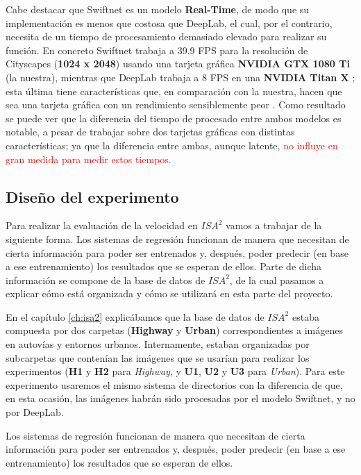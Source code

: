 Cabe destacar que Swiftnet \cite{swiftnet} es un modelo \textbf{Real-Time}, de modo que su implementación es menos que costosa que DeepLab, el cual, por el contrario, necesita de un tiempo de procesamiento demasiado elevado para realizar su función. En concreto Swiftnet trabaja a 39.9 \ac{FPS} para la resolución de Cityscapes (\textbf{1024 x 2048}) usando una tarjeta gráfica \textbf{NVIDIA GTX 1080 Ti} (la nuestra), mientras que DeepLab trabaja a 8 \ac{FPS} en una \textbf{NVIDIA Titan X} \cite{deeplab}; esta última tiene características que, en comparación con la nuestra, hacen que sea una tarjeta gráfica con un rendimiento sensiblemente peor \cite{gtx_titan}. Como resultado se puede ver que la diferencia del tiempo de procesado entre ambos modelos es notable, a pesar de trabajar sobre dos tarjetas gráficas con distintas características; ya que la diferencia entre ambas, aunque latente, \textcolor{Red}{no influye en gran medida para medir estos tiempos}. %

\subsection{Diseño del experimento}

Para realizar la evaluación de la velocidad en $ISA^{2}$ vamos a trabajar de la siguiente forma. Los sistemas de regresión funcionan de manera que necesitan de cierta información para poder ser entrenados y, después, poder predecir (en base a ese entrenamiento) los resultados que se esperan de ellos. Parte de dicha información se compone de la base de datos de $ISA^{2}$, de la cual pasamos a explicar cómo está organizada y cómo se utilizará en esta parte del proyecto.

En el capítulo \ref{ch:isa2} explicábamos que la base de datos de $ISA^{2}$ estaba compuesta por dos carpetas (\textbf{Highway} y \textbf{Urban}) correspondientes a imágenes en autovías y entornos urbanos. Internamente, estaban organizadas por subcarpetas que contenían las imágenes que se usarían para realizar los experimentos (\textbf{H1} y \textbf{H2} para \textit{Highway}, y \textbf{U1}, \textbf{U2} y \textbf{U3} para \textit{Urban}). Para este experimento usaremos el mismo sistema de directorios con la diferencia de que, en esta ocasión, las imágenes habrán sido procesadas por el modelo Swiftnet, y no por DeepLab.

Los sistemas de regresión funcionan de manera que necesitan de cierta información para poder ser entrenados y, después, poder predecir (en base a ese entrenamiento) los resultados que se esperan de ellos.

